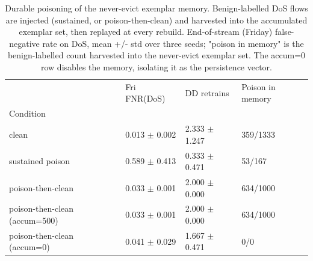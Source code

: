\begin{table}
\caption{Durable poisoning of the never-evict exemplar memory. Benign-labelled DoS flows are injected (sustained, or poison-then-clean) and harvested into the accumulated exemplar set, then replayed at every rebuild. End-of-stream (Friday) false-negative rate on DoS, mean +/- std over three seeds; "poison in memory" is the benign-labelled count harvested into the never-evict exemplar set. The accum=0 row disables the memory, isolating it as the persistence vector.}
\label{tab:rq2-durable-poison}
\begin{tabular}{llll}
\toprule
 & Fri FNR(DoS) & DD retrains & Poison in memory \\
Condition &  &  &  \\
\midrule
clean & 0.013 $\pm$ 0.002 & 2.333 $\pm$ 1.247 & 359/1333 \\
sustained poison & 0.589 $\pm$ 0.413 & 0.333 $\pm$ 0.471 & 53/167 \\
poison-then-clean & 0.033 $\pm$ 0.001 & 2.000 $\pm$ 0.000 & 634/1000 \\
poison-then-clean (accum=500) & 0.033 $\pm$ 0.001 & 2.000 $\pm$ 0.000 & 634/1000 \\
poison-then-clean (accum=0) & 0.041 $\pm$ 0.029 & 1.667 $\pm$ 0.471 & 0/0 \\
\bottomrule
\end{tabular}
\end{table}
